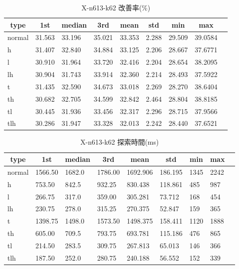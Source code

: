 \begin{table}[htbp]
    \caption{X-n613-k62 改善率(\%)}
    \begin{tabular}{|l|l|l|l|l|l|l|l|l|}\hline
    \multicolumn{1}{|c|}{\textbf{type}}
    &\multicolumn{1}{|c|}{\textbf{1st}}
    &\multicolumn{1}{c|}{\textbf{median}}
    &\multicolumn{1}{c|}{\textbf{3rd}}
    &\multicolumn{1}{c|}{\textbf{mean}}
    &\multicolumn{1}{c|}{\textbf{std}}
    &\multicolumn{1}{c|}{\textbf{min}}
    &\multicolumn{1}{c|}{\textbf{max}}\\\hline
	normal & 31.563 & 33.196 & 35.021 & 33.353 & 2.288 & 29.509 & 39.0584\\\hline
	h & 31.407 & 32.840 & 34.884 & 33.125 & 2.206 & 28.667 & 37.6771\\\hline
	l & 30.910 & 31.964 & 33.720 & 32.416 & 2.204 & 28.654 & 38.2095\\\hline
	lh & 30.904 & 31.743 & 33.914 & 32.360 & 2.214 & 28.493 & 37.5922\\\hline
	t & 31.435 & 32.590 & 34.673 & 33.018 & 2.269 & 28.270 & 38.6404\\\hline
	th & 30.682 & 32.705 & 34.599 & 32.842 & 2.464 & 28.804 & 38.8185\\\hline
	tl & 30.445 & 31.936 & 33.456 & 32.317 & 2.296 & 28.715 & 37.9566\\\hline
	tlh & 30.286 & 31.947 & 33.328 & 32.013 & 2.242 & 28.440 & 37.6521\\\hline
	\end{tabular}
\end{table}
\begin{table}[htbp]
    \caption{X-n613-k62 探索時間(ms)}
    \begin{tabular}{|l|l|l|l|l|l|l|l|l|}\hline
    \multicolumn{1}{|c|}{\textbf{type}}
    &\multicolumn{1}{|c|}{\textbf{1st}}
    &\multicolumn{1}{c|}{\textbf{median}}
    &\multicolumn{1}{c|}{\textbf{3rd}}
    &\multicolumn{1}{c|}{\textbf{mean}}
    &\multicolumn{1}{c|}{\textbf{std}}
    &\multicolumn{1}{c|}{\textbf{min}}
    &\multicolumn{1}{c|}{\textbf{max}}\\\hline
	normal & 1566.50 & 1682.0 & 1786.00 & 1692.906 & 186.195 & 1345 & 2242\\\hline
	h & 753.50 & 842.5 & 932.25 & 830.438 & 118.861 & 485 & 987\\\hline
	l & 266.75 & 317.0 & 359.00 & 305.281 & 73.712 & 168 & 454\\\hline
	lh & 230.75 & 278.0 & 315.25 & 270.375 & 52.847 & 159 & 365\\\hline
	t & 1398.75 & 1498.0 & 1573.50 & 1498.375 & 158.411 & 1120 & 1888\\\hline
	th & 605.00 & 709.5 & 793.75 & 693.781 & 115.186 & 476 & 865\\\hline
	tl & 214.50 & 283.5 & 309.75 & 267.813 & 65.013 & 146 & 366\\\hline
	tlh & 187.50 & 252.0 & 280.75 & 240.188 & 56.552 & 152 & 339\\\hline
	\end{tabular}
\end{table}
